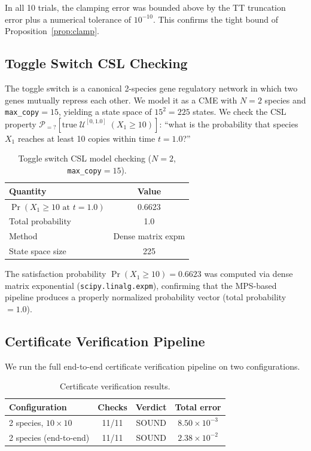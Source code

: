 \documentclass[11pt]{article}
\begin{document}
In all 10 trials, the clamping error was bounded above by the
TT truncation error plus a numerical tolerance of $10^{-10}$.
This confirms the tight bound of Proposition~\ref{prop:clamp}.

\subsection{Toggle Switch CSL Checking}\label{sec:exp:toggle}

The toggle switch is a canonical 2-species gene regulatory network
in which two genes mutually repress each other.
We model it as a CME with $N=2$ species and \texttt{max\_copy}${}=15$,
yielding a state space of $15^2 = 225$ states.
We check the CSL property
$\mathcal{P}_{=?}[\text{true}\;\mathcal{U}^{[0,1.0]}\;(X_1 \geq 10)]$:
``what is the probability that species $X_1$ reaches at least 10
copies within time $t=1.0$?''

\begin{table}[t]
\centering
\caption{Toggle switch CSL model checking ($N=2$, \texttt{max\_copy}${}=15$).}
\label{tab:toggle}
\begin{tabular}{lc}
\toprule
\textbf{Quantity} & \textbf{Value} \\
\midrule
$\Pr(X_1 \geq 10 \text{ at } t=1.0)$ & 0.6623 \\
Total probability & 1.0 \\
Method & Dense matrix expm \\
State space size & 225 \\
\bottomrule
\end{tabular}
\end{table}

The satisfaction probability $\Pr(X_1 \geq 10) = 0.6623$ was computed
via dense matrix exponential (\texttt{scipy.linalg.expm}), confirming
that the MPS-based pipeline produces a properly normalized
probability vector (total probability $= 1.0$).

\subsection{Certificate Verification Pipeline}\label{sec:exp:cert}

We run the full end-to-end certificate verification pipeline on
two configurations.

\begin{table}[t]
\centering
\caption{Certificate verification results.}
\label{tab:cert}
\begin{tabular}{lccc}
\toprule
\textbf{Configuration} & \textbf{Checks} & \textbf{Verdict} & \textbf{Total error} \\
\midrule
2 species, $10\times 10$ & 11/11 & SOUND & $8.50\times 10^{-3}$ \\
2 species (end-to-end) & 11/11 & SOUND & $2.38\times 10^{-2}$ \\
\bottomrule
\end{tabular}
\end{table}
\end{document}
